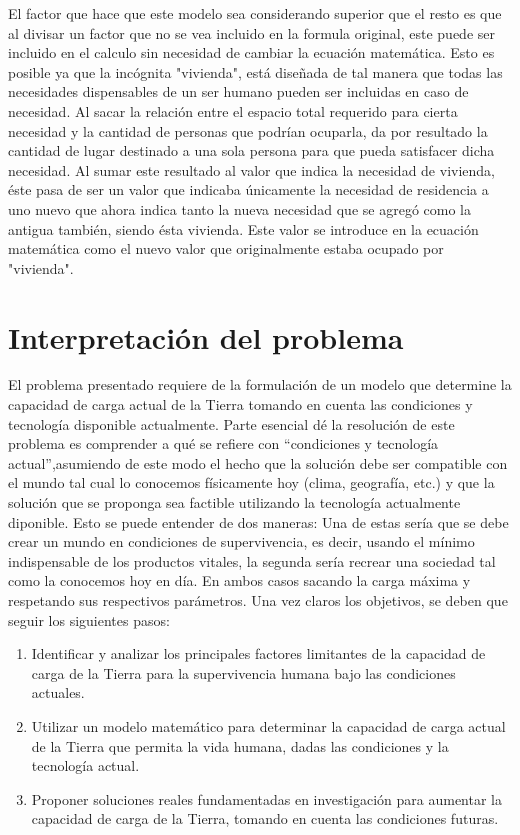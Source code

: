\documentclass[12pt]{report}
\begin{document}
  El factor que hace que este modelo sea considerando superior que el resto es que al divisar un factor que no se vea incluido en la formula original, este puede ser incluido en el calculo sin necesidad de cambiar la ecuaci\'on matem\'atica. Esto es posible ya que la inc\'ognita "vivienda", est\'a dise\~nada de tal manera que todas las necesidades dispensables de un ser humano pueden ser incluidas en caso de necesidad. 
  Al sacar la relaci\'on entre el espacio total requerido para cierta necesidad y la cantidad de personas que podr\'ian ocuparla, da por resultado la cantidad de lugar destinado a una sola persona para que pueda satisfacer dicha necesidad. Al sumar este resultado al valor que indica la necesidad de vivienda, \'este pasa de ser un valor que indicaba \'unicamente la necesidad de residencia a uno nuevo que ahora indica tanto la nueva necesidad que se agreg\'o como la antigua tambi\'en, siendo \'esta vivienda. Este valor se introduce en la ecuaci\'on matem\'atica como el nuevo valor que originalmente estaba ocupado por "vivienda". 


\section*{Interpretaci\'on del problema}

El problema presentado requiere de la formulaci\'on de un  modelo que determine la capacidad de carga actual de la Tierra tomando en cuenta las condiciones y tecnolog\'ia disponible actualmente. Parte esencial d\'e la resoluci\'on de este problema es comprender a qu\'e se refiere con  ``condiciones y tecnolog\'ia actual'',asumiendo de este modo el hecho que la soluci\'on debe ser compatible con el mundo tal cual lo conocemos f\'isicamente hoy (clima, geograf\'ia, etc.) y que la soluci\'on que se proponga sea factible utilizando la tecnolog\'ia actualmente diponible. Esto se puede entender de dos maneras: Una de estas ser\'ia que se debe crear un mundo en condiciones de supervivencia, es decir, usando el m\'inimo indispensable de los productos vitales, la segunda ser\'ia recrear una sociedad tal como la conocemos hoy en d\'ia. En ambos casos sacando la carga m\'axima y respetando sus respectivos par\'ametros. Una vez claros los objetivos, se deben
que seguir los siguientes pasos:
\begin{enumerate}
  \item Identificar y analizar los principales factores limitantes de la capacidad de carga de la Tierra para la supervivencia humana bajo las condiciones actuales. 
  \item Utilizar un modelo matem\'atico para determinar la capacidad de carga actual de la Tierra que permita la vida humana, dadas las condiciones y la tecnolog\'ia actual.
  \item Proponer soluciones reales fundamentadas en investigaci\'on para aumentar la capacidad de carga de la Tierra, tomando en cuenta las condiciones futuras.
\end{enumerate}
\end{document}
